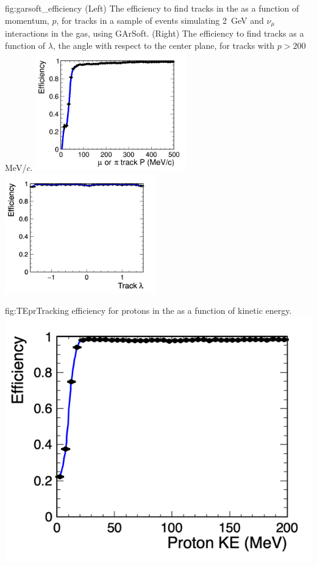 \begin{dunefigure}{fig:garsoft_efficiency}
{(Left) The efficiency to find tracks in the  as a function of momentum, $p$, for tracks in a sample of  events simulating \SI{2}{GeV} and $\nu_\mu$ interactions in the gas, using GArSoft. (Right) The efficiency to find tracks as a function of $\lambda$, the angle with respect to the center plane, for tracks with $p>200\,$MeV/$c$.}
    \includegraphics[width=0.49\textwidth]{graphics/effvsp.png}\includegraphics[width=0.49\textwidth]{graphics/effvslambdagt200MeV.png}
\end{dunefigure}

\begin{dunefigure}{fig:TEpr}{Tracking efficiency for protons in the  as a function of kinetic energy.} 
\includegraphics[width=0.65\columnwidth]{graphics/effvske.png} 
\end{dunefigure}

